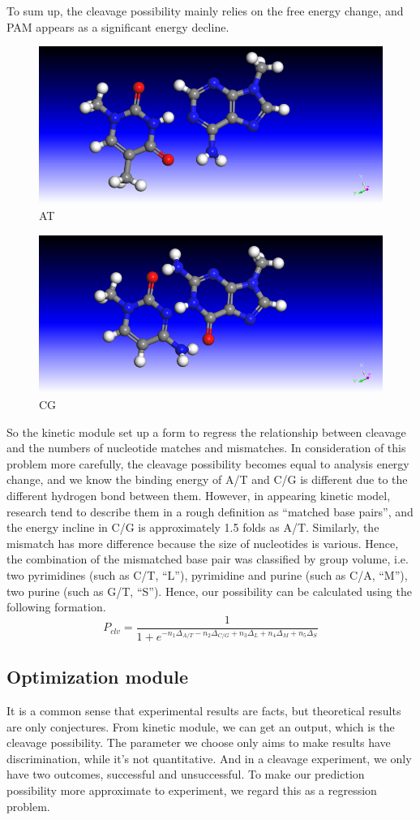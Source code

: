 To sum up, the cleavage possibility mainly relies on the free energy change, and PAM appears as a significant energy decline.
\begin{figure}[h]
	\centering
	\includegraphics[width=0.7\linewidth]{AT}
	\caption{AT}
	\label{fig:6}
\end{figure}
\begin{figure}[h]
	\centering
	\includegraphics[width=0.7\linewidth]{CG}
	\caption{CG}
	\label{fig:7}
\end{figure}
So the kinetic module set up a form to regress the relationship between cleavage and the numbers of nucleotide matches and mismatches.
In consideration of this problem more carefully, the cleavage possibility becomes equal to analysis energy change, and we know the binding energy of A/T and C/G is different due to the different hydrogen bond between them. However, in appearing kinetic model, research tend to describe them in a rough definition as “matched base pairs”, and the energy incline in C/G is approximately 1.5 folds as A/T. Similarly, the mismatch has more difference because the size of nucleotides is various. Hence, the combination of the mismatched base pair was classified by group volume, i.e. two pyrimidines (such as C/T, “L”), pyrimidine and purine (such as C/A, “M”), two purine (such as G/T, “S”). Hence, our possibility can be calculated using the following formation.
\begin{equation}
P_{clv}=\frac{1}{1+e^{-n_1\Delta_{A/T}-n_2\Delta_{C/G}+n_3\Delta_{L}+n_4\Delta_{M}+n_5\Delta_{S}}}
\end{equation}

\subsection{Optimization module}
It is a common sense that experimental results are facts, but theoretical results are only conjectures. From kinetic module, we can get an output, which is the cleavage possibility. The parameter we choose only aims to make results have discrimination, while it’s not quantitative. And in a cleavage experiment, we only have two outcomes, successful and unsuccessful. To make our prediction possibility more approximate to experiment, we regard this as a regression problem.

